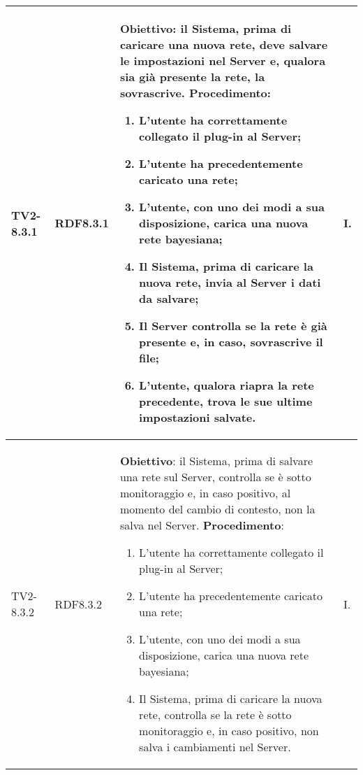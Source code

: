 \begin{longtable}{|C{.15\textwidth}|C{.13\textwidth}|m{.52\textwidth}|C{.08\textwidth}|}
TV2-8.3.1 & RDF8.3.1 &
	\textbf{Obiettivo}: il Sistema, prima di caricare una nuova rete, deve salvare le impostazioni nel Server e, qualora sia già presente la rete, la sovrascrive. \newline
	\textbf{Procedimento}:
	\begin{enumerate}
		\item L'utente ha correttamente collegato il plug-in al Server;
		\item L'utente ha precedentemente caricato una rete;
		\item L'utente, con uno dei modi a sua disposizione, carica una nuova rete bayesiana;
		\item Il Sistema, prima di caricare la nuova rete, invia al Server i dati da salvare;
		\item Il Server controlla se la rete è già presente e, in caso, sovrascrive il file;
		\item L'utente, qualora riapra la rete precedente, trova le sue ultime impostazioni salvate.
	\end{enumerate}
	& I. \\
\hline	

TV2-8.3.2 & RDF8.3.2 &
	\textbf{Obiettivo}: il Sistema, prima di salvare una rete sul Server, controlla se è sotto monitoraggio e, in caso positivo, al momento del cambio di contesto, non la salva nel Server. \newline
	\textbf{Procedimento}:
	\begin{enumerate}
		\item L'utente ha correttamente collegato il plug-in al Server;
		\item L'utente ha precedentemente caricato una rete;
		\item L'utente, con uno dei modi a sua disposizione, carica una nuova rete bayesiana;
		\item Il Sistema, prima di caricare la nuova rete, controlla se la rete è sotto monitoraggio e, in caso positivo, non salva i cambiamenti nel Server.
	\end{enumerate}
	& I. \\
\hline	


\end{longtable}
